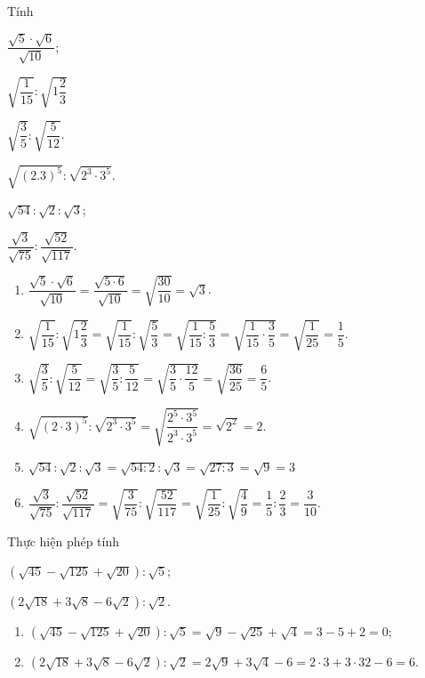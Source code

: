 \begin{vd}%
	Tính
	\begin{listEX}[3]
	\item $\dfrac{\sqrt{5} \cdot \sqrt{6}}{\sqrt{10}}$;
	\item $\sqrt{\dfrac{1}{15}}: \sqrt{1 \dfrac{2}{3}}$
	\item $\sqrt{\dfrac{3}{5}}: \sqrt{\dfrac{5}{12}}$.
	\item $\sqrt{(2.3)^5}:\sqrt{2^3\cdot 3^5}$.
	\item $\sqrt{54}:\sqrt{2}:\sqrt{3}$;
	\item $\dfrac{\sqrt{3}}{\sqrt{75}}:\dfrac{\sqrt{52}}{\sqrt{117}}$.
	\end{listEX}
	\loigiai
	{
	\begin{enumerate}
	\item $\dfrac{\sqrt{5} \cdot \sqrt{6}}{\sqrt{10}} = \dfrac{\sqrt{5\cdot 6}}{\sqrt{10}} = \sqrt{\dfrac{30}{10}}=\sqrt{3}$.
	\item $\sqrt{\dfrac{1}{15}}: \sqrt{1\dfrac{2}{3}}=\sqrt{\dfrac{1}{15}}: \sqrt{\dfrac{5}{3}}=\sqrt{\dfrac{1}{15}: \dfrac{5}{3}}=\sqrt{\dfrac{1}{15}\cdot \dfrac{3}{5}}=\sqrt{\dfrac{1}{25}}=\dfrac{1}{5}$.
	\item $\sqrt{\dfrac{3}{5}}: \sqrt{\dfrac{5}{12}}=\sqrt{\dfrac{3}{5}: \dfrac{5}{12}}=\sqrt{\dfrac{3}{5}\cdot \dfrac{12}{5}} = \sqrt{\dfrac{36}{25}} = \dfrac{6}{5}$.
	\item $\sqrt{(2\cdot 3)^5}:\sqrt{2^3\cdot 3^5}=\sqrt{\dfrac{2^5\cdot 3^5}{2^3\cdot 3^5}}=\sqrt{2^2}= 2$.
	\item $\sqrt{54}:\sqrt{2}:\sqrt{3}=\sqrt{54 : 2}:\sqrt{3}=\sqrt{27 : 3}=\sqrt{9}= 3$
	\item $\dfrac{\sqrt{3}}{\sqrt{75}}:\dfrac{\sqrt{52}}{\sqrt{117}}=\sqrt{\dfrac{3}{75}}:\sqrt{\dfrac{52}{117}}=\sqrt{\dfrac{1}{25}}:\sqrt{\dfrac{4}{9}}=\dfrac{1}{5}:\dfrac{2}{3}=\dfrac{3}{10}$.
	\end{enumerate}
	}
\end{vd}
\begin{vd}%
	Thực hiện phép tính
	\begin{listEX}[2]
	\item $(\sqrt{45} - \sqrt{125} + \sqrt{20}) :\sqrt{5}$;
	\item $(2\sqrt{18} + 3\sqrt{8} - 6\sqrt{2}) :\sqrt{2}$.
	\end{listEX}
	\loigiai
	{
	\begin{enumerate}
	\item $\left(\sqrt{45} - \sqrt{125} + \sqrt{20}\right) :\sqrt{5}=\sqrt{9} - \sqrt{25} + \sqrt{4}= 3 - 5 + 2 = 0$;
	\item $\left(2\sqrt{18} + 3\sqrt{8} - 6\sqrt{2}\right) :\sqrt{2}= 2\sqrt{9} + 3\sqrt{4} - 6 = 2\cdot3 + 3\cdot32 - 6 = 6$.
	\end{enumerate}
	}
\end{vd}
